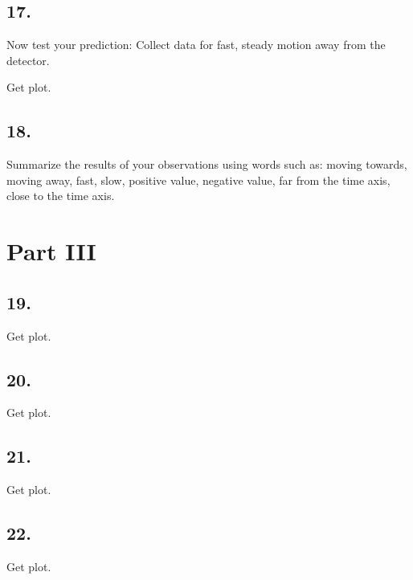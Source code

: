     \begin{mdframed}
        
    \end{mdframed}

    \subsection*{17.}
    Now test your prediction: Collect data for fast, steady motion away from the detector.

    \begin{mdframed}
        Get plot.
    \end{mdframed}

    \subsection*{18.}
    Summarize the results of your observations using words such as: moving towards, moving away, fast, slow, positive value, negative value, far from the time axis, close to the time axis.

    \section*{Part III}

    \subsection*{19.}

    \begin{mdframed}
        Get plot.
    \end{mdframed}

    \subsection*{20.}

    \begin{mdframed}
        Get plot.
    \end{mdframed}
    
    \subsection*{21.}

    \begin{mdframed}
        Get plot.
    \end{mdframed}

    \subsection*{22.}

    \begin{mdframed}
        Get plot.
    \end{mdframed}


